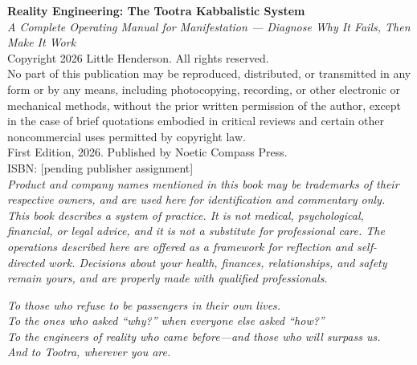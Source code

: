 \thispagestyle{empty}
\vspace*{\fill}
\begin{center}
\begin{minipage}{0.85\textwidth}
\small
\noindent
\textbf{Reality Engineering: The Tootra Kabbalistic System}\\
\textit{A Complete Operating Manual for Manifestation --- Diagnose Why It
Fails, Then Make It Work}\\[6pt]
Copyright \textcopyright{} 2026 Little Henderson. All rights reserved.\\[6pt]
No part of this publication may be reproduced, distributed, or transmitted in
any form or by any means, including photocopying, recording, or other
electronic or mechanical methods, without the prior written permission of the
author, except in the case of brief quotations embodied in critical reviews and
certain other noncommercial uses permitted by copyright law.\\[6pt]
First Edition, 2026. Published by Noetic Compass Press.\\[6pt]
ISBN: [pending publisher assignment]\\[6pt]
\textit{Product and company names mentioned in this book may be trademarks of
their respective owners, and are used here for identification and commentary
only.}\\[6pt]
\textit{This book describes a system of practice. It is not medical,
psychological, financial, or legal advice, and it is not a substitute for
professional care. The operations described here are offered as a framework for
reflection and self-directed work. Decisions about your health, finances,
relationships, and safety remain yours, and are properly made with qualified
professionals.}
\end{minipage}
\end{center}
\vspace*{\fill}
\cleardoublepage

\thispagestyle{empty}
\vspace*{2.4in}
\begin{center}
\begin{minipage}{0.72\textwidth}
\itshape\centering
To those who refuse to be passengers in their own lives.\\[10pt]
To the ones who asked ``why?'' when everyone else asked ``how?''\\[10pt]
To the engineers of reality who came before---and those who will surpass
us.\\[10pt]
And to Tootra, wherever you are.
\end{minipage}
\end{center}
\cleardoublepage

{%
  \hypersetup{linkcolor=black}%
  \tableofcontents*
}
\clearpage

{%
  \hypersetup{linkcolor=black}%
  \listoffigures
}
\clearpage
